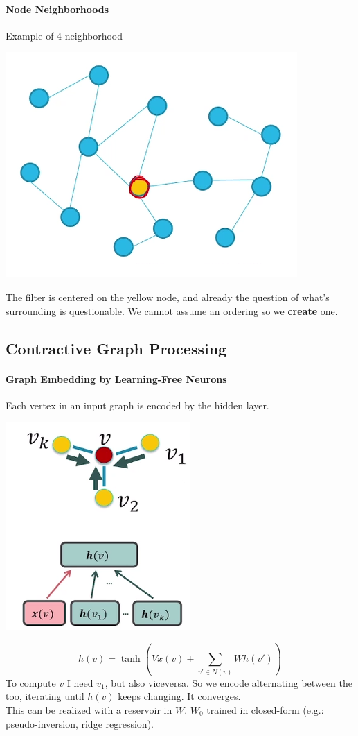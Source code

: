 \documentclass[10pt]{report}
\begin{document}
\paragraph{Node Neighborhoods} Example of 4-neighborhood
\begin{center}
	\includegraphics[scale=0.5]{196.png}
\end{center}
The filter is centered on the yellow node, and already the question of what's surrounding is questionable. We cannot assume an ordering so we \textbf{create} one.

\subsection{Contractive Graph Processing}
\paragraph{Graph Embedding by Learning-Free Neurons} Each vertex in an input graph is encoded by the hidden layer.
\begin{center}
	\includegraphics[scale=0.5]{197.png}
\end{center}
$$h(v) = \tanh\left(V x(v)+\sum_{v'\in N(v)} Wh(v')\right)$$ %
To compute $v$ I need $v_1$, but also viceversa. So we encode alternating between the too, iterating until $h(v)$ keeps changing. It converges.\\
This can be realized with a reservoir in $W$. $W_0$ trained in closed-form (e.g.: pseudo-inversion, ridge regression).
\end{document}
